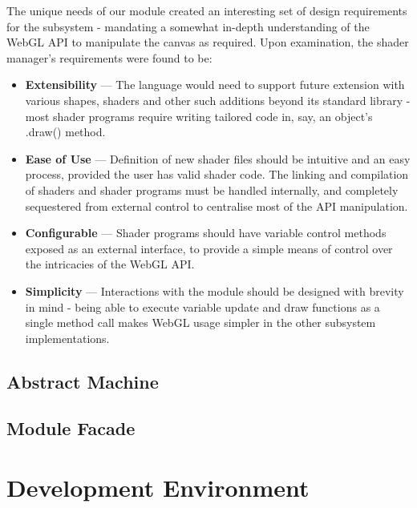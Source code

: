 \documentclass{l3proj}
\begin{document}
The unique needs of our module created an interesting set of design requirements for the subsystem - mandating a somewhat in-depth understanding of the WebGL API to manipulate the canvas as required. Upon examination, the shader manager's requirements were found to be:
\begin{itemize}
\item \textbf{Extensibility} --- The language would need to support future extension with various shapes, shaders and other such additions beyond its standard library - most shader programs require writing tailored code in, say, an object's .draw() method.
\item \textbf{Ease of Use} --- Definition of new shader files should be intuitive and an easy process, provided the user has valid shader code. The linking and compilation of shaders and shader programs must be handled internally, and completely sequestered from external control to centralise most of the API manipulation.
\item \textbf{Configurable} --- Shader programs should have variable control methods exposed as an external interface, to provide a simple means of control over the intricacies of the WebGL API.
\item \textbf{Simplicity} --- Interactions with the module should be designed with brevity in mind - being able to execute variable update and draw functions as a single method call makes WebGL usage simpler in the other subsystem implementations.
\end{itemize}

\section{Abstract Machine}
\label{arch-abs}

\section{Module Facade}
\label{arch-module}

\chapter{Development Environment}
\label{dev}

\end{document}
